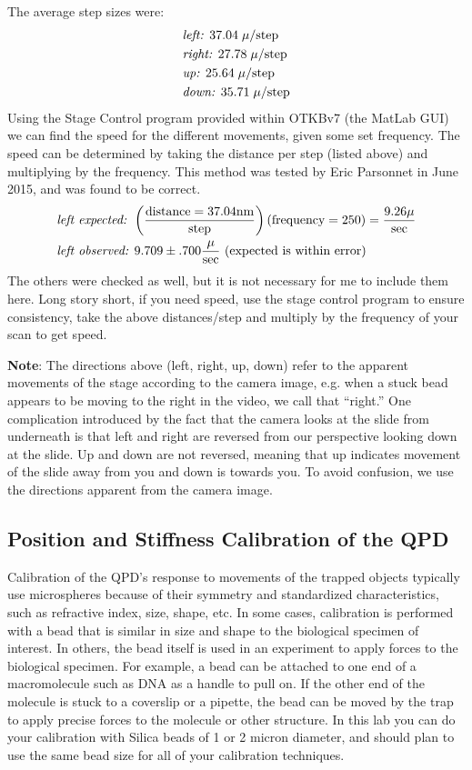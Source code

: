 \documentclass{../lab}
\begin{document}
The average step sizes were:
\begin{align*}
    &\emph{left: } 37.04 \;\mu/\text{step} \\
    &\emph{right: } 27.78 \;\mu/\text{step} \\
    &\emph{up: } 25.64 \;\mu/\text{step} \\
    &\emph{down: } 35.71 \;\mu/\text{step}
\end{align*}
Using the Stage Control program provided within OTKBv7 (the MatLab GUI) we can find the speed for the different movements, given some set frequency. The speed can be determined by taking the distance per step (listed above) and multiplying by the frequency. This method was tested by Eric Parsonnet in June 2015, and was found to be correct.
\begin{align*}
    &\emph{left expected: } \left(\frac{\text{distance} = 37.04 \text{nm}}{\text{step}}\right)(\text{frequency} = 250)=\frac{9.26 \mu}{\text{sec}} \\
    &\emph{left observed: } 9.709 \pm .700 \frac{\mu}{\text{sec}} \text{ (expected is within error)}
\end{align*}
The others were checked as well, but it is not necessary for me to include them here. Long story short, if you need speed, use the stage control program to ensure consistency, take the above distances/step and multiply by the frequency of your scan to get speed.

\textbf{Note}: The directions above (left, right, up, down) refer to the apparent movements of the stage according to the camera image, e.g. when a stuck bead appears to be moving to the right in the video, we call that ``right.'' One complication introduced by the fact that the camera looks at the slide from underneath is that left and right are reversed from our perspective looking down at the slide. Up and down are not reversed, meaning that up indicates movement of the slide away from you and down is towards you. To avoid confusion, we use the directions apparent from the camera image.

\subsection{Position and Stiffness Calibration of the QPD}

\newpage

Calibration of the QPD's response to movements of the trapped objects typically use microspheres because of their symmetry and standardized characteristics, such as refractive index, size, shape, etc. In some cases, calibration is performed with a bead that is similar in size and shape to the biological specimen of interest. In others, the bead itself is used in an experiment to apply forces to the biological specimen. For example, a bead can be attached to one end of a macromolecule such as DNA as a handle to pull on. If the other end of the molecule is stuck to a coverslip or a pipette, the bead can be moved by the trap to apply precise forces to the molecule or other structure. In this lab you can do your calibration with Silica beads of 1 or 2 micron diameter, and should plan to use the same bead size for all of your calibration techniques.
\end{document}
